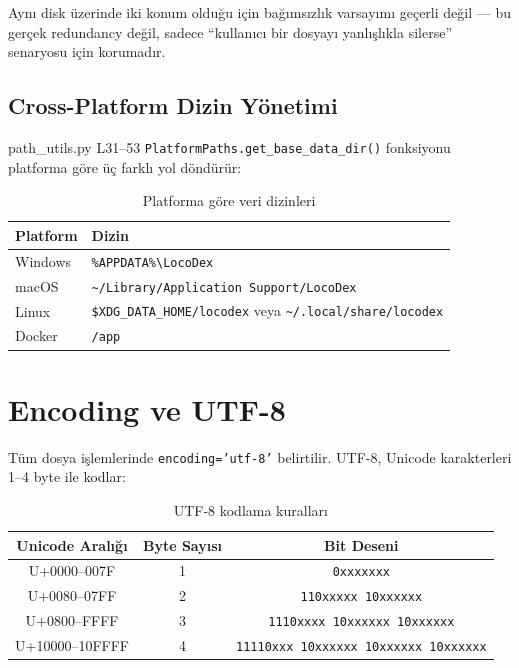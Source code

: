 Ayn{\i} disk \"{u}zerinde iki konum oldu\u{g}u i\c{c}in ba\u{g}{\i}ms{\i}zl{\i}k varsay{\i}m{\i} ge\c{c}erli de\u{g}il --- bu ger\c{c}ek redundancy de\u{g}il, sadece ``kullan{\i}c{\i} bir dosyay{\i} yanl{\i}\c{s}l{\i}kla silerse'' senaryosu i\c{c}in korumad{\i}r.

\subsection{Cross-Platform Dizin Y\"{o}netimi}

\begin{kodref}{path\_utils.py L31--53}
\texttt{PlatformPaths.get\_base\_data\_dir()} fonksiyonu platforma g\"{o}re \"{u}\c{c} farkl{\i} yol d\"{o}nd\"{u}r\"{u}r:
\end{kodref}

\begin{table}[H]
\centering
\caption{Platforma g\"{o}re veri dizinleri}
\label{tab:platform_dirs}
\begin{tabularx}{\textwidth}{lX}
\toprule
\color{chapterBlue}\textbf{Platform} & \color{chapterBlue}\textbf{Dizin} \\
\midrule
Windows & \texttt{\%APPDATA\%\textbackslash LocoDex} \\
macOS   & \texttt{\textasciitilde /Library/Application Support/LocoDex} \\
Linux   & \texttt{\$XDG\_DATA\_HOME/locodex} veya \texttt{\textasciitilde /.local/share/locodex} \\
Docker  & \texttt{/app} \\
\bottomrule
\end{tabularx}
\end{table}


\section{Encoding ve UTF-8}
\label{sec:encoding}

T\"{u}m dosya i\c{s}lemlerinde \texttt{encoding='utf-8'} belirtilir. UTF-8, Unicode karakterleri 1--4 byte ile kodlar:

\begin{table}[H]
\centering
\caption{UTF-8 kodlama kurallar{\i}}
\label{tab:utf8}
\begin{tabular}{ccc}
\toprule
\color{chapterBlue}\textbf{Unicode Aral{\i}\u{g}{\i}} & \color{chapterBlue}\textbf{Byte Say{\i}s{\i}} & \color{chapterBlue}\textbf{Bit Deseni} \\
\midrule
U+0000--007F & 1 & \texttt{0xxxxxxx} \\
U+0080--07FF & 2 & \texttt{110xxxxx 10xxxxxx} \\
U+0800--FFFF & 3 & \texttt{1110xxxx 10xxxxxx 10xxxxxx} \\
U+10000--10FFFF & 4 & \texttt{11110xxx 10xxxxxx 10xxxxxx 10xxxxxx} \\
\bottomrule
\end{tabular}
\end{table}

